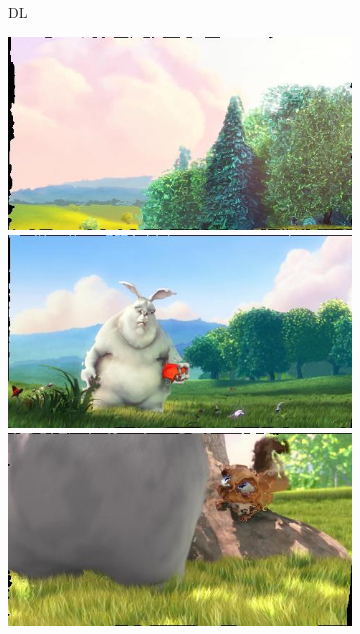 \begin{figure}
\begin{subfigure}[t]{0.135\textwidth}
		\caption{DL}
	\end{subfigure}
	\begin{subfigure}[t]{0.135\textwidth}
		\includegraphics[width=\textwidth]{figures/stereo/bbb_frame-0004-11}\\
		\includegraphics[width=\textwidth]{figures/stereo/bbb_frame-0092-11}\\
		\includegraphics[width=\textwidth]{figures/stereo/bbb_frame-0124-11}\\

\end{subfigure}
\end{figure}
